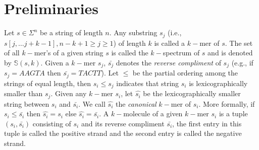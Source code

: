 \documentclass[runningheads]{llncs}
\begin{document}
\section{Preliminaries}
\label{sec:prelim}
Let $s \in \Sigma^{n}$ be a string of length $n$. Any substring $s_j$ (i.e., $s[j,\ldots j+k-1], n-k+1\geq j\geq 1$) of 
length $k$ is called a $k-$mer of $s$. The set of all $k-$mer's of a given string $s$ is called the $k-$spectrum of 
$s$ and is denoted by $\mathbb{S}(s,k)$. Given a $k-$mer $s_j$, $\bar{s_j}$ denotes the {\em reverse compliment} of $s_j$ (e.g., if $s_j = AAGTA$ then $\bar{s_j} = TACTT$). Let $\leq$ be the partial ordering among the strings of equal length, 
then $s_i \leq s_j$ indicates that string $s_i$ is lexicographically smaller than $s_j$. Given any $k-$mer $s_i$, 
let $\hat{s_i}$ be the lexicographically smaller string between $s_i$ and $\bar{s_i}$. 
We call $\hat{s_i}$ the {\em canonical} $k-$mer of $s_i$. More formally, if $s_i \leq \bar{s_i}$ then $\hat{s_i} = s_i$ 
else $\hat{s_i} = \bar{s_i}$. A $k-$molecule of a given $k-$mer $s_i$ is a tuple $(s_i,\bar{s_i})$ 
consisting of $s_i$ and its reverse compliment $\bar{s_i}$, the first entry in this tuple is called the 
positive strand and the second entry is called the negative strand.
\end{document}
